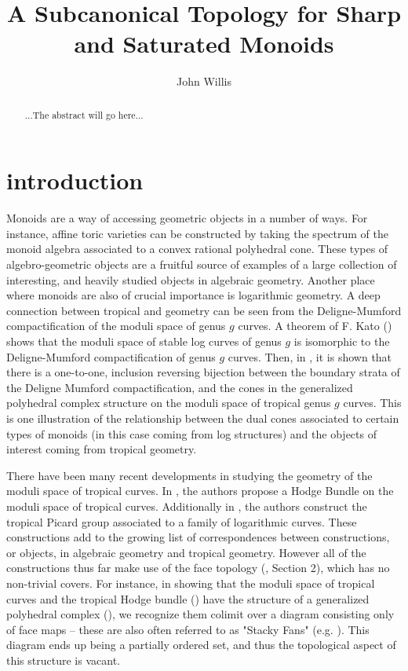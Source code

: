 \documentclass[12pt]{amsart}
\numberwithin{equation}{section}
\theoremstyle{plain}
\theoremstyle{remark}
\begin{document}
\title{A Subcanonical Topology for Sharp and Saturated Monoids}
\author{John Willis}
\maketitle

\begin{abstract}
	...The abstract will go here...
\end{abstract}


\section{introduction}
	Monoids are a way of accessing geometric objects in a number of ways. For instance, affine toric varieties can be constructed by taking the spectrum of the monoid algebra associated to a convex rational polyhedral cone. These types of algebro-geometric objects are a fruitful source of examples of a large collection of interesting, and heavily studied objects in algebraic geometry. Another place where monoids are also of crucial importance is logarithmic geometry. A deep connection between tropical and geometry can be seen from the Deligne-Mumford compactification of the moduli space of genus $g$ curves. A theorem of F. Kato (\cite{Kato}) shows that the moduli space of stable log curves of genus $g$ is isomorphic to the Deligne-Mumford compactification of genus $g$ curves. Then, in \cite{TropCurve}, it is shown that there is a one-to-one, inclusion reversing bijection between the boundary strata of the Deligne Mumford compactification, and the cones in the generalized polyhedral complex structure on the moduli space of tropical genus $g$ curves. This is one illustration of the relationship between the dual cones associated to certain types of monoids (in this case coming from log structures) and the objects of interest coming from tropical geometry. 
	
	There have been many recent developments in studying the geometry of the moduli space of tropical curves. In \cite{LinUl}, the authors propose a Hodge Bundle on the moduli space of tropical curves. Additionally in \cite{MolchoWise}, the authors construct the tropical Picard group associated to a family of logarithmic curves. These constructions add to the growing list of correspondences between constructions, or objects, in algebraic geometry and tropical geometry. However all of the constructions thus far make use of the face topology (\cite{CCUW}, Section 2), which has no non-trivial covers. For instance, in showing that the moduli space of tropical curves and the tropical Hodge bundle (\cite{LinUl}) have the structure of a generalized polyhedral complex (\cite{CCUW}), we recognize them colimit over a diagram consisting only of face maps -- these are also often referred to as "Stacky Fans" (e.g. \cite{ChanSiegel}). This diagram ends up being a partially ordered set, and thus the topological aspect of this structure is vacant.
	
\end{document}
